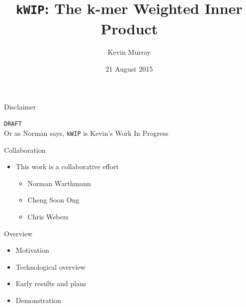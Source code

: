 \documentclass[t]{beamer}
\title{\texttt{kWIP}: The k-mer Weighted Inner Product}
\author{Kevin Murray}
\institute{Borevitz Lab, CPEB, ANU}
\date{21 August 2015}
\begin{document}
{
\begin{frame}
  \titlepage
  \vfill
\end{frame}
}

\begin{frame}{Disclaimer}
  \begin{center}
    \vfill
    \texttt{DRAFT}
    \\
    \pause
    \small{Or as Norman says, \texttt{kWIP} is Kevin's Work In Progress}
    \vfill
  \end{center}
\end{frame}


\begin{frame}{Collaboration}
  \begin{itemize}
    \item This work is a collaborative effort
      \begin{itemize}
        \item Norman Warthmann
        \item Cheng Soon Ong
        \item Chris Webers
      \end{itemize}
  \end{itemize}
\end{frame}

\begin{frame}{Overview}
  \begin{itemize}
    \item Motivation
    \item Technological overview
    \item Early results and plans
    \item Demonstration
  \end{itemize}
\end{frame}
\end{document}

